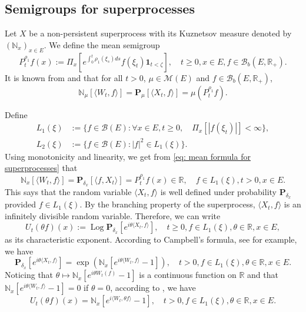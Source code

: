 \documentclass[12pt,a4paper]{amsart}
\theoremstyle{plain}
\theoremstyle{definition}
\numberwithin{equation}{section}
\begin{document}
\subsection{{Semigroups for superprocesses}}
\label{sec: definition of vf}
    Let $X$ be a non-persistent superprocess with its Kuznetsov measure denoted by $(\mathbb N_x)_{x\in E}$.
    We define the mean semigroup
\begin{equation}
    P_t^{\rho_1} f(x)
    := \Pi_{x}[e^{\int_0^t \rho_1(\xi_s)ds}f(\xi_t) \mathbf 1_{t< \zeta}],
    \quad t\geq 0, x\in E, f\in \mathcal B_b(E,\mathbb R_+).
\end{equation}
    It is known from \cite[Proposition 2.27]{Li2011Measure-valued} and \cite[Theorem 2.7]{Kyprianou2014Fluctuations} that for all $t > 0$, $\mu \in \mathcal M(E)$ and $f\in \mathcal B_b(E,\mathbb R_+)$,
\begin{equation}
\label{eq: mean formula for superprocesses}
   \mathbb N_{\mu}[\langle W_t, f\rangle]
   =\mathbf P_{\mu}[\langle X_t, f\rangle]
   =\mu(P^{\rho_1}_t f).
\end{equation}

    Define
\begin{align}
    L_1(\xi)
    &:= \{f\in \mathcal B(E): \forall x\in E, t\geq 0, \quad \Pi_x[|f(\xi_t)|]< \infty\},
    \\L_2(\xi)
    &:= \{f \in \mathcal B(E): |f|^2 \in L_1(\xi)\}.
\end{align}
    Using monotonicity and linearity, we get from \eqref{eq: mean formula for superprocesses}  that
\begin{equation}
   \mathbb N_x[\langle W_t, f\rangle]
    =\mathbf P_{\delta_x}[\langle f, X_t\rangle]
    =P^{\rho_1}_t f(x) \in \mathbb R,
    \quad f\in L_1(\xi), t > 0,x\in E.
\end{equation}
    This says that the random variable $\langle X_t, f\rangle$ is well defined under probability $\mathbf P_{\delta_x}$ provided $f\in L_1(\xi)$.
    By the branching property of the superprocess, $\langle X_t, f\rangle$ is an infinitely divisible random variable.
    Therefore, we can write
\[
    U_t(\theta f)(x) := \operatorname{Log} \mathbf P_{\delta_x}[e^{i \theta \langle X_t, f\rangle}],
    \quad t\geq 0, f\in L_1(\xi), \theta \in \mathbb R, x\in E,
\]
    as its characteristic exponent.
    According to Campbell's formula, see \cite[Theorem 2.7]{Kyprianou2014Fluctuations} for example, we have
\[
    \mathbf P_{\delta_x} [e^{i\theta \langle X_t, f\rangle}]
    = \exp(\mathbb N_x[ e^{i\theta \langle W_t, f\rangle} - 1]),
    \quad t>0, f\in L_1(\xi), \theta \in \mathbb R, x\in E.
\]
    Noticing that $\theta \mapsto \mathbb N_x[e^{i\theta W_t(f)} - 1]$ is a continuous function on $\mathbb R$ and that $\mathbb N_x[e^{i\theta \langle W_t, f\rangle} - 1] = 0$ if $\theta = 0$, according to \cite[Lemma 7.6]{Sato2013Levy}, we have
\begin{equation}
\label{eq: N and characteristic exponent}
    U_t(\theta f)(x) = \mathbb N_x[e^{i \langle W_t, \theta f\rangle} - 1],
    \quad t>0, f\in L_1(\xi), \theta \in \mathbb R, x\in E.
\end{equation}
\end{document}
